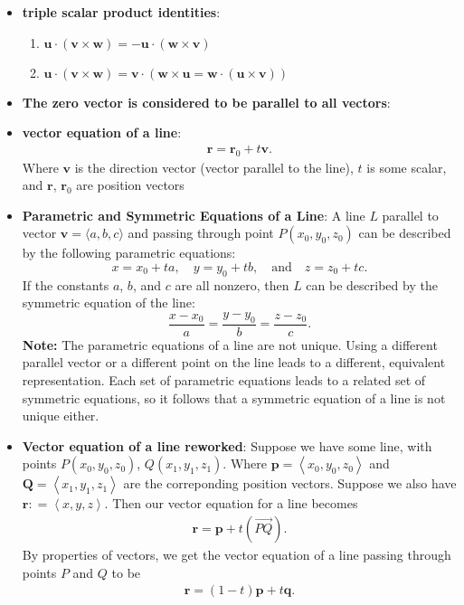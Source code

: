 \documentclass{report}
\begin{document}
\begin{itemize}
    \item \textbf{triple scalar product identities}: 
        \begin{enumerate}[label=(\alph*)]
            \item $\mathbf{u} \cdot (\mathbf{v} \times \mathbf{w}) = -\mathbf{u} \cdot (\mathbf{w} \times \mathbf{v})$
            \item $\mathbf{u} \cdot (\mathbf{v} \times \mathbf{w}) = \mathbf{v} \cdot (\mathbf{w} \times \mathbf{u} = \mathbf{w} \cdot (\mathbf{u} \times \mathbf{v}))$
        \end{enumerate}
    \item \textbf{The zero vector is considered to be parallel to all vectors}:
    \item \textbf{vector equation of a line}:
        \begin{align*}
            \mathbf{r} = \mathbf{r}_{0} + t\mathbf{v} 
        .\end{align*}
        Where $\mathbf{v}$ is the direction vector (vector parallel to the line), $t$ is some scalar, and $\mathbf{r}$, $\mathbf{r}_{0}$ are position vectors
    \item \textbf{Parametric and Symmetric Equations of a Line}:
        A line $L$ parallel to vector $\mathbf{v}=\langle a,b,c \rangle$ and passing through point $P(x_0,y_0,z_0)$ can be described by the following parametric equations:
        \[
            x=x_0+ta, \quad y=y_0+tb, \quad \text{and} \quad z=z_0+tc.
        \]
        If the constants $a$, $b$, and $c$ are all nonzero, then $L$ can be described by the symmetric equation of the line:
        \[
            \frac{x-x_0}{a} = \frac{y-y_0}{b} = \frac{z-z_0}{c}.
        \]
        \bigbreak \noindent 
        \textbf{Note:} The parametric equations of a line are not unique. Using a different parallel vector or a different point on the line leads to a different, equivalent representation. Each set of parametric equations leads to a related set of symmetric equations, so it follows that a symmetric equation of a line is not unique either.
    \item \textbf{Vector equation of a line reworked}: Suppose we have some line, with points $P(x_{0}, y_{0}, z_{0})$, $Q(x_{1}, y_{1}, z_{1})$. Where $\mathbf{p} = \left\langle x_{0}, y_{0}, z_{0}\right\rangle $ and $\mathbf{Q} = \left\langle x_{1}, y_{1}, z_{1}\right\rangle $ are the correponding position vectors. Suppose we also have $\mathbf{r}: = \left\langle x,y,z \right\rangle $. Then our vector equation for a line becomes 
        \begin{align*}
            \mathbf{r} = \mathbf{p} + t\left(\vec{PQ}\right)
        .\end{align*} 
        By properties of vectors, we get the vector equation of a line passing through points $P$ and $Q$ to be 
        \begin{align*}
            \mathbf{r} = (1-t)\mathbf{p} + t\mathbf{q}
        .\end{align*}



    \end{itemize}
\end{document}

